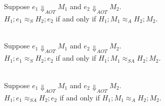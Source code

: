 \documentclass{article}
\begin{document}
\begin{proposition}
  ~\\
  Suppose $e_1 \Downarrow_{AOT} M_1$ and $e_2 \Downarrow_{AOT} M_2$.\\
  $H_1; e_1 \approx_S H_2; e_2$ if and only if $H_1; M_1 \approx_A H_2; M_2$.
\end{proposition}

\begin{lemma}
  ~\\
  Suppose $e_1 \Downarrow_{AOT} M_1$ and $e_2 \Downarrow_{AOT} M_2$.\\
  $H_1; e_1 \approx_S H_2; e_2$ if and only if $H_1; M_1 \approx_{SA} H_2; M_2$.
\end{lemma}

\begin{lemma}
  ~\\
  Suppose $e_1 \Downarrow_{AOT} M_1$ and $e_2 \Downarrow_{AOT} M_2$.\\
  $H_1; e_1 \approx_{SA} H_2; e_2$ if and only if $H_1; M_1 \approx_{A} H_2; M_2$.
\end{lemma}
\end{document}
